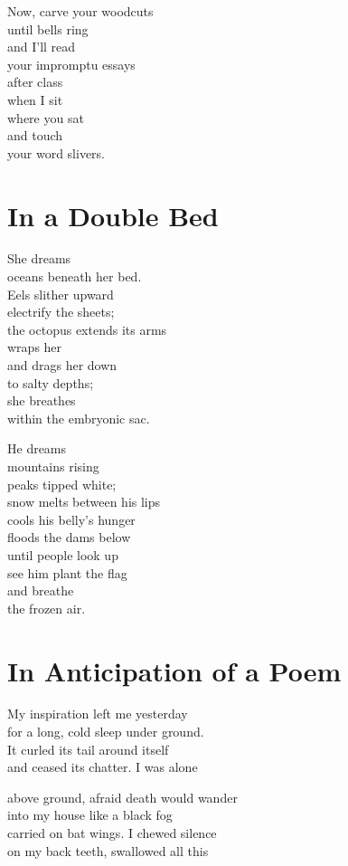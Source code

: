\documentclass[twoside,10pt]{book}
\begin{document}
Now, carve your woodcuts\\
until bells ring\\
and I'll read\\
your impromptu essays\\
after class\\
when I sit\\
where you sat\\
and touch\\
your word slivers.


\clearpage
\section{In a Double Bed}

She dreams\\
oceans beneath her bed.\\
Eels slither upward\\
electrify the sheets;\\
the octopus extends its arms\\
wraps her\\
and drags her down\\
to salty depths;\\
she breathes\\
within the embryonic sac.

He dreams\\
mountains rising\\
peaks tipped white;\\
snow melts between his lips\\
cools his belly's hunger\\
floods the dams below\\
until people look up\\
see him plant the flag\\
and breathe\\
the frozen air.


\clearpage
\section{In Anticipation of a Poem}

My inspiration left me yesterday\\
for a long, cold sleep under ground.\\
It curled its tail around itself\\
and ceased its chatter. I was alone

above ground, afraid death would wander\\
into my house like a black fog\\
carried on bat wings. I chewed silence\\
on my back teeth, swallowed all this
\end{document}
